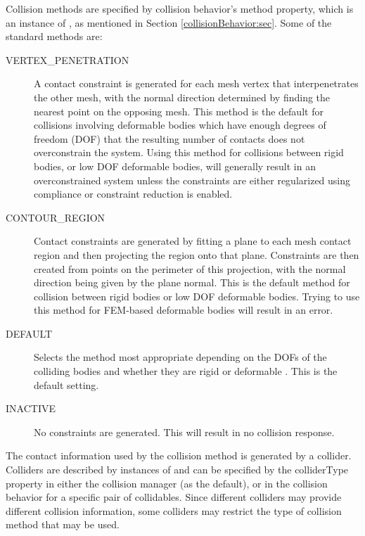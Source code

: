 Collision methods are specified by collision behavior's {\sf method}
property, which is an instance of
, as
mentioned in Section \ref{collisionBehavior:sec}.  Some of the
standard methods are:

\begin{description}

\item[VERTEX\_PENETRATION]\mbox{}

A contact constraint is generated for each mesh vertex that
interpenetrates the other mesh, with the normal direction determined
by finding the nearest point on the opposing mesh.  This method is the
default for collisions involving deformable bodies which have enough
degrees of freedom (DOF) that the resulting number of contacts does
not overconstrain the system.  Using this method for collisions
between rigid bodies, or low DOF deformable bodies, will generally
result in an overconstrained system unless the constraints are either
regularized using compliance or constraint reduction is enabled.

\item[CONTOUR\_REGION]\mbox{}

Contact constraints are generated by fitting a plane to each mesh
contact region and then projecting the region onto that plane.
Constraints are then created from points on the perimeter of this
projection, with the normal direction being given by the plane
normal. This is the default method for collision between rigid bodies
or low DOF deformable bodies. Trying to use this method for FEM-based
deformable bodies will result in an error.

\item[DEFAULT]\mbox{}

Selects the method most appropriate depending on the DOFs of the
colliding bodies and whether they are rigid or deformable . This is
the default setting.

\item[INACTIVE]\mbox{}

No constraints are generated. This will result in no collision
response.

\end{description}

The contact information used by the collision method is generated by a
collider. Colliders are described by instances of
and can be specified by the {\sf colliderType} property in either the
collision manager (as the default), or in the collision behavior for a
specific pair of collidables. Since different colliders may provide
different collision information, some colliders may restrict the type
of collision method that may be used.

